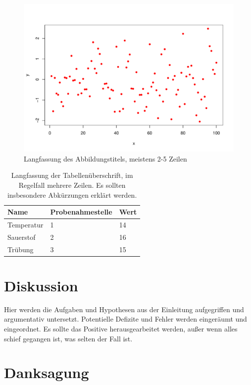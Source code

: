 \documentclass[ngerman,11pt,a4paper]{article}
\begin{document}
\begin{figure}
	\centering
	\includegraphics[width=\textwidth]{pdf-plot.pdf}
	\caption[Kurzfassung des Abbildungstitels]{Langfassung des Abbildungstitels,
	         meistens 2-5 Zeilen}\label{fig:fig_1}
\end{figure}

\begin{table}
	\centering
	\caption[Kurzfassung der Tabellenüberschrft]{Langfassung der Tabellenüberschrift,
	        im Regelfall mehrere Zeilen. Es sollten insbesondere Abkürzungen erklärt werden.}
	\label{tab:my_label}
	\begin{tabular}{lll}\hline
		Name & Probenahmestelle & Wert\\\hline
		Temperatur & 1  & 14  \\
		Sauerstof & 2  & 16 \\
		Trübung & 3 & 15 \\ \hline
	\end{tabular}
\end{table}


\section{Diskussion}

Hier werden die Aufgaben und Hypothesen aus der Einleitung aufgegriffen und
argumentativ untersetzt. Potentielle Defizite und Fehler werden eingeräumt und
eingeordnet. Es sollte das Positive herausgearbeitet werden, außer wenn alles
schief gegangen ist, was selten der Fall ist.

\section*{Danksagung} %
\end{document}
